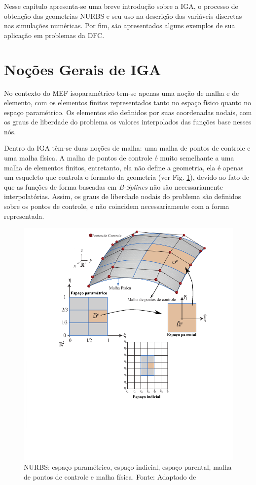 \documentclass[tese_patricia]{subfiles}
\begin{document}
Nesse capítulo apresenta-se uma breve introdução sobre a IGA, o processo de obtenção das geometrias NURBS e seu uso na descrição das variáveis discretas nas simulações numéricas. Por fim, são apresentados alguns exemplos de sua aplicação em problemas da DFC.

\vspace{-0.1cm}

\section{Noções Gerais de IGA}

No contexto do MEF isoparamétrico tem-se apenas uma noção de malha e de elemento, com os elementos finitos representados tanto no espaço físico quanto no espaço paramétrico. Os elementos são definidos por suas coordenadas nodais, com os graus de liberdade do problema os valores interpolados das funções base nesses nós.

Dentro da IGA têm-se duas noções de malha: uma malha de pontos de controle e uma malha física. A malha de pontos de controle é muito semelhante a uma malha de elementos finitos, entretanto, ela não define a geometria, ela é apenas um esqueleto que controla o formato da geometria (ver Fig. \ref{fig:espacos}), devido ao fato de que as funções de forma baseadas em \textit{B-Splines} não são necessariamente interpolatórias. Assim, os graus de liberdade nodais do problema são definidos sobre os pontos de controle, e não coincidem necessariamente com a forma representada.

\begin{figure}[htb!]
	\centering 
	\includegraphics[scale=1.0,trim=1cm 4cm 0cm 0cm, clip=true]{Imagens/Cap3/espacosNURBS.pdf}	
	\caption{NURBS: espaço paramétrico, espaço indicial, espaço parental, malha de pontos de controle e malha física. Fonte: Adaptado de }
	\label{fig:espacos}
\end{figure}
\end{document}
